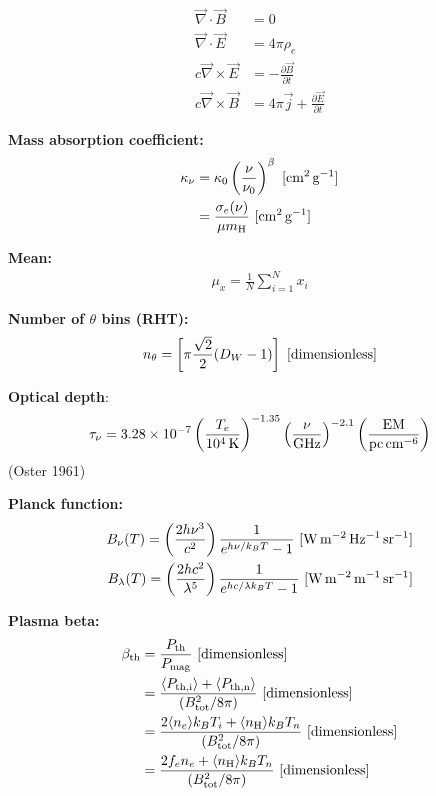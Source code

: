 \documentclass[a4paper,10pt]{article}
\begin{document}
\begin{align*}
    \vec\nabla\cdot\vec{B} &= 0 \\
    \vec\nabla\cdot\vec{E} &= 4\pi\rho_e \\
    c\vec\nabla\times\vec{E} &= - \frac{\partial\vec{B}}{\partial t} \\
    c\vec\nabla\times\vec{B} &= 4\pi\vec{j} + \frac{\partial\vec{E}}{\partial t}
\end{align*}

{\noindent}\textbf{Mass absorption coefficient:}
\begin{align*}
    \kappa_\nu &= \kappa_0 \left(\frac{\nu}{\nu_0}\right)^\beta ~ [{\rm cm^2\,g^{-1}}] \\
                       &= \frac{\sigma_e(\nu)}{\mu m_{\rm H}} ~ [{\rm cm^2\,g^{-1}}]
\end{align*}

{\noindent}\textbf{Mean:} 
\begin{align*}
    \mu_x = \frac{1}{N} \sum_{i=1}^N x_i
\end{align*}

{\noindent}\textbf{Number of $\theta$ bins (RHT):}
\begin{align*}
    n_\theta = \left[\pi\frac{\sqrt{2}}{2}(D_W-1)\right] ~ [{\rm dimensionless}]
\end{align*}

{\noindent}\textbf{Optical depth}:
\begin{align*}
    \tau_\nu = 3.28\times10^{-7} \left(\frac{T_e}{10^4\,{\rm K}}\right)^{-1.35} \left(\frac{\nu}{\rm GHz}\right)^{-2.1} \left(\frac{\rm EM}{\rm pc\,cm^{-6}}\right)
\end{align*}
(Oster 1961)

{\noindent}\textbf{Planck function:}
\begin{align*}
    B_\nu(T) = \left(\frac{2h\nu^3}{c^2}\right) \frac{1}{e^{h\nu/k_BT}-1} ~ [{\rm W\,m^{-2}\,Hz^{-1}\,sr^{-1}}] \\
    B_\lambda(T) = \left(\frac{2hc^2}{\lambda^5}\right) \frac{1}{e^{hc/\lambda k_BT}-1} ~ [{\rm W\,m^{-2}\,m^{-1}\,sr^{-1}}]
\end{align*}

{\noindent}\textbf{Plasma beta:} 
\begin{align*}
\beta_{\rm th} &= \frac{P_{\rm th}}{P_{\rm mag}} ~ [{\rm dimensionless}]\\
                      &= \frac{ \langle P_{\rm th,i}\rangle + \langle P_{\rm th,n}\rangle }{(B_{\rm tot}^2/8\pi)} ~ [{\rm dimensionless}] \\
                      &= \frac{2\langle n_e\rangle k_BT_i + \langle n_{\rm H}\rangle k_BT_n}{(B_{\rm tot}^2/8\pi)}  ~ [{\rm dimensionless}] \\
                      &= \frac{2f_en_e+ \langle n_{\rm H}\rangle k_BT_n}{(B_{\rm tot}^2/8\pi)}  ~ [{\rm dimensionless}]
\end{align*}
\end{document}
